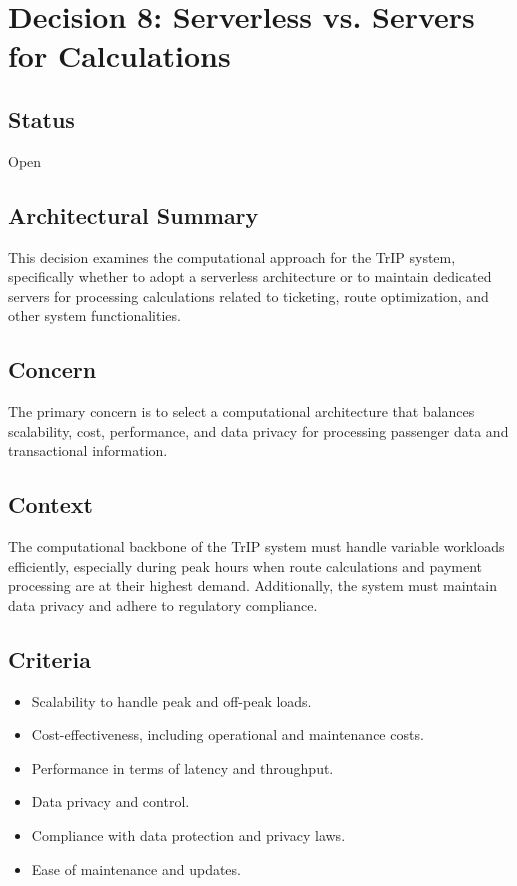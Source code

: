 \section*{Decision 8: Serverless vs. Servers for Calculations}

\subsection*{Status}
Open

\subsection*{Architectural Summary}
This decision examines the computational approach for the TrIP system, specifically whether to adopt a serverless architecture or to maintain dedicated servers for processing calculations related to ticketing, route optimization, and other system functionalities.

\subsection*{Concern}
The primary concern is to select a computational architecture that balances scalability, cost, performance, and data privacy for processing passenger data and transactional information.

\subsection*{Context}
The computational backbone of the TrIP system must handle variable workloads efficiently, especially during peak hours when route calculations and payment processing are at their highest demand. Additionally, the system must maintain data privacy and adhere to regulatory compliance.

\subsection*{Criteria}
\begin{itemize}
    \item Scalability to handle peak and off-peak loads.
    \item Cost-effectiveness, including operational and maintenance costs.
    \item Performance in terms of latency and throughput.
    \item Data privacy and control.
    \item Compliance with data protection and privacy laws.
    \item Ease of maintenance and updates.
\end{itemize}

